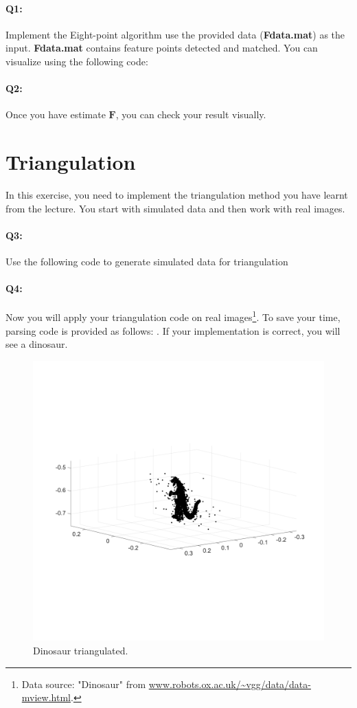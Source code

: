 \documentclass[a4paper]{article}
\begin{document}
\paragraph{Q1:} 
Implement the Eight-point algorithm use the provided data (\textbf{Fdata.mat}) as the input. \textbf{Fdata.mat} contains feature points detected and matched. You can visualize using the following code:

\paragraph{Q2:} 
Once you have estimate $\mathbf{F}$, you can check your result visually. 

\section{Triangulation}
In this exercise, you need to implement the triangulation method you have learnt from the lecture. You start with simulated data and then work with real images.
\paragraph{Q3:} 
Use the following code to generate simulated data for triangulation


\paragraph{Q4:} 
Now you will apply your triangulation code on real images\footnote{Data source: "Dinosaur" from \url{www.robots.ox.ac.uk/~vgg/data/data-mview.html}.}. To save your time, parsing code is provided as follows:
. If your implementation is correct, you will see a dinosaur.
\begin{figure}[!b]
\centering
\includegraphics[scale=0.5]{figures/dino.png}
\caption{Dinosaur triangulated.}
\end{figure}
\end{document}
